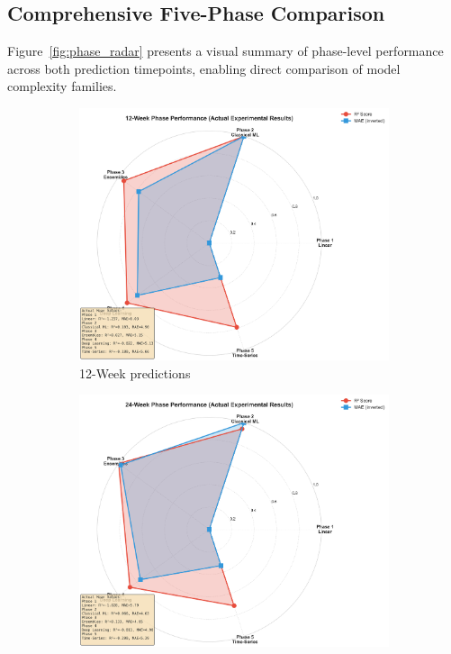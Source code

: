 \documentclass[conference]{IEEEtran}
\begin{document}
\subsection{Comprehensive Five-Phase Comparison}

Figure~\ref{fig:phase_radar} presents a visual summary of phase-level performance across both prediction timepoints, enabling direct comparison of model complexity families.

\begin{figure}[t]
\centering
\begin{subfigure}[b]{0.48\textwidth}
    \centering
    \includegraphics[width=\textwidth]{figures/phase_radar_12w_actual.png}
    \caption{12-Week predictions}
\end{subfigure}
\hfill
\begin{subfigure}[b]{0.48\textwidth}
    \centering
    \includegraphics[width=\textwidth]{figures/phase_radar_24w_actual.png}

\end{subfigure}
\end{figure}
\end{document}
